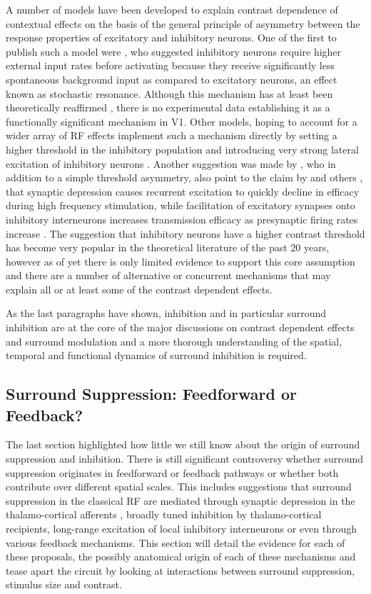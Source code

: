 A number of models have been developed to explain contrast dependence
of contextual effects on the basis of the general principle of
asymmetry between the response properties of excitatory and inhibitory
neurons. One of the first to publish such a model were
\cite{Stemmler1995}, who suggested inhibitory neurons require higher
external input rates before activating because they receive
significantly less spontaneous background input as compared to
excitatory neurons, an effect known as stochastic resonance. Although
this mechanism has at least been theoretically reaffirmed
\citep{Bezrukov1997}, there is no experimental data establishing it as
a functionally significant mechanism in V1. Other models, hoping to
account for a wider array of RF effects implement such a mechanism
directly by setting a higher threshold in the inhibitory population
and introducing very strong lateral excitation of inhibitory neurons
\citep{Schwabe2006}. Another suggestion was made by \cite{Somers1998},
who in addition to a simple threshold asymmetry, also point to the
claim by \cite{Thomson1994} and others \citep{Abbott1997,Tsodyks1997},
that synaptic depression causes recurrent excitation to quickly
decline in efficacy during high frequency stimulation, while
facilitation of excitatory synapses onto inhibitory interneurons
increases transmission efficacy as presynaptic firing rates increase
\citep{Thomson1995}. The suggestion that inhibitory neurons have a
higher contrast threshold has become very popular in the theoretical
literature of the past 20 years, however as of yet there is only
limited evidence to support this core assumption and there are a
number of alternative or concurrent mechanisms that may explain all or
at least some of the contrast dependent effects.

As the last paragraphs have shown, inhibition and in particular
surround inhibition are at the core of the major discussions on
contrast dependent effects and surround modulation and a more thorough
understanding of the spatial, temporal and functional dynamics of
surround inhibition is required.

\subsection{Surround Suppression: Feedforward or Feedback?}

The last section highlighted how little we still know about the origin
of surround suppression and inhibition. There is still significant
controversy whether surround suppression originates in feedforward or
feedback pathways or whether both contribute over different spatial
scales. This includes suggestions that surround suppression in the
classical RF are mediated through synaptic depression in the
thalamo-cortical afferents \citep{Carandini2002}, broadly tuned
inhibition by thalamo-cortical recipients, long-range excitation of
local inhibitory interneurons or even through various feedback
mechanisms. This section will detail the evidence for each of these
proposals, the possibly anatomical origin of each of these mechanisms
and tease apart the circuit by looking at interactions between
surround suppression, stimulus size and contrast.

